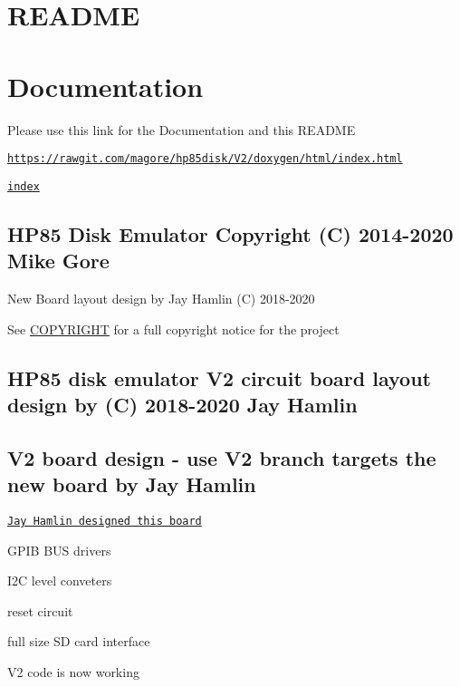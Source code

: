 \hypertarget{md_README_README}{}\section{R\+E\+A\+D\+ME}\label{md_README_README}
\section*{Documentation}


\begin{DoxyItemize}
\item Please use this link for the Documentation and this R\+E\+A\+D\+ME
\begin{DoxyItemize}
\item \href{https://rawgit.com/magore/hp85disk/V2/doxygen/html/index.html}{\tt https\+://rawgit.\+com/magore/hp85disk/\+V2/doxygen/html/index.\+html}
\item \href{doxygen/html/index.html}{\tt index}
\end{DoxyItemize}
\end{DoxyItemize}

\subsection*{H\+P85 Disk Emulator Copyright (C) 2014-\/2020 Mike Gore}


\begin{DoxyItemize}
\item New Board layout design by Jay Hamlin (C) 2018-\/2020
\item See \hyperlink{COPYRIGHT_8md}{C\+O\+P\+Y\+R\+I\+G\+HT} for a full copyright notice for the project
\end{DoxyItemize}

\subsection*{H\+P85 disk emulator V2 circuit board layout design by (C) 2018-\/2020 Jay Hamlin}

\subsection*{V2 board design -\/ use V2 branch targets the new board by Jay Hamlin}


\begin{DoxyItemize}
\item \href{board/V2/releases}{\tt Jay Hamlin designed this board}
\begin{DoxyItemize}
\item G\+P\+IB B\+US drivers
\item I2C level conveters
\item reset circuit
\item full size SD card interface
\item V2 code is now working
\end{DoxyItemize}
\end{DoxyItemize}

